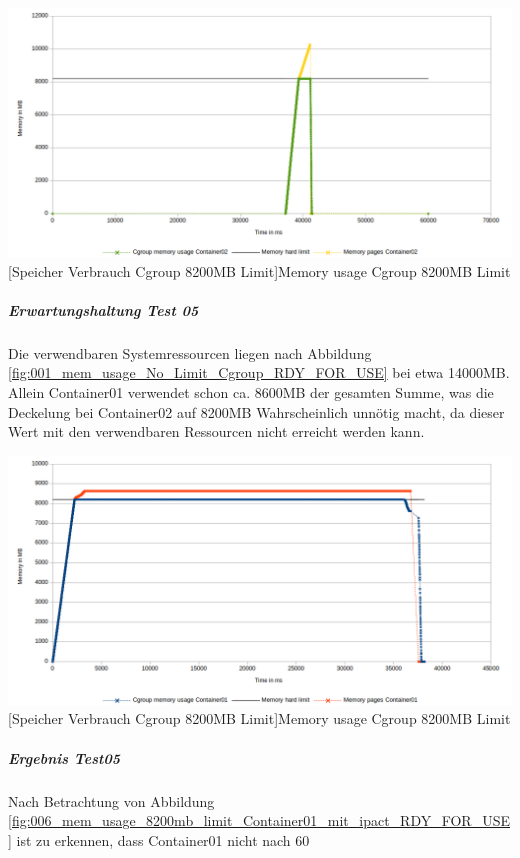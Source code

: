 \vspace{1em}
\begin{minipage}{\linewidth}
	\centering
	\includegraphics[width=1\linewidth]{pics/005_mem_usage_8200mb_limit_Container02_Basis_RDY_FOR_USE_FOCUS.png}
	[Speicher Verbrauch Cgroup 8200MB Limit]{Memory usage Cgroup 8200MB Limit}
	\label{fig:005_mem_usage_8200mb_limit_Container02_Basis_RDY_FOR_USE_FOCUS}
\end{minipage}

\subparagraph{Erwartungshaltung Test 05}
Die verwendbaren Systemressourcen liegen nach Abbildung \ref{fig:001_mem_usage_No_Limit_Cgroup_RDY_FOR_USE} bei etwa 14000MB. Allein Container01 verwendet schon ca. 8600MB der gesamten Summe, was die Deckelung bei Container02 auf 8200MB Wahrscheinlich unnötig macht, da dieser Wert mit den verwendbaren Ressourcen nicht erreicht werden kann. 

\vspace{1em}
\begin{minipage}{\linewidth}
	\centering
	\includegraphics[width=1\linewidth]{pics/006_mem_usage_8200mb_limit_Container01_mit_ipact_RDY_FOR_USE.png}
	[Speicher Verbrauch Cgroup 8200MB Limit]{Memory usage Cgroup 8200MB Limit}
	\label{fig:006_mem_usage_8200mb_limit_Container01_mit_ipact_RDY_FOR_USE}
\end{minipage}

\subparagraph{Ergebnis Test05}
Nach Betrachtung von Abbildung \ref{fig:006_mem_usage_8200mb_limit_Container01_mit_ipact_RDY_FOR_USE} ist zu erkennen, dass Container01 nicht nach 60
\pagebreak
